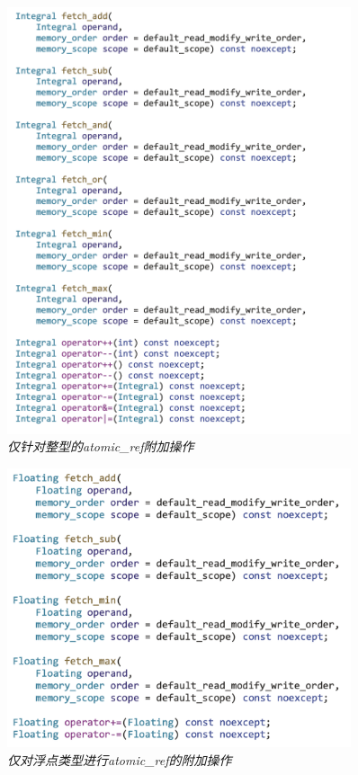 \begin{figure}[H]
	\centering
	\includegraphics[width=0.9\textwidth]{figs/F19.13.png}
	\caption{\textit{仅针对整型的atomic\_ref附加操作 }}
\end{figure}

\begin{figure}[H]
	\centering
	\includegraphics[width=0.9\textwidth]{figs/F19.14.png}
	\caption{\textit{仅对浮点类型进行atomic\_ref的附加操作 }}
\end{figure}

